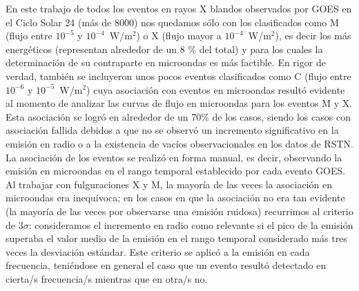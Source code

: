 \documentclass[baaa]{baaa}
\begin{document}
En este trabajo de todos los eventos en rayos X blandos observados por GOES en el Ciclo Solar 24 
(m\'as de 8000) nos quedamos s\'olo con los clasificados como M (flujo entre $10^{-5}$ y $10^{-4}$~W/m$^2$) 
o X (flujo mayor a $10^{-4}$~W/m$^2$), es decir los m\'as energ\'eticos (representan alrededor de un 8 \% del total) 
y para los cuales la determinaci\'on  de su contraparte en microondas es m\'as factible. En rigor de verdad, tambi\'en 
se incluyeron unos pocos eventos clasificados como C (flujo entre $10^{-6}$ y $10^{-5}$~W/m$^2$) cuya asociaci\'on 
con eventos en microondas result\'o evidente al momento de analizar las curvas de flujo en microondas para los eventos 
M y X. Esta asociaci\'on se logr\'o en alrededor de un 70\% de los casos, siendo los casos con asociaci\'on fallida 
debidos a que no se observ\'o un incremento significativo en la emisi\'on en radio o a la existencia de vac\'ios 
observacionales en los datos de RSTN. La asociaci\'on de los eventos se realiz\'o en forma manual, es decir, 
observando la emisi\'on en microondas en el rango temporal establecido por cada evento GOES. Al trabajar con fulguraciones  X y M, la mayor\'ia de las veces la asociaci\'on en microondas era inequ\'ivoca; en los casos en que la asociaci\'on no era tan evidente (la mayor\'ia de las veces por observarse una emisi\'on ruidosa) recurrimos al 
criterio de $3\sigma$: consideramos el 
incremento en radio como relevante si el pico de la emisi\'on superaba el valor medio de la emisi\'on en el rango temporal considerado 
m\'as tres veces la desviaci\'on est\'andar. Este criterio se aplic\'o a la emisi\'on en cada frecuencia, teni\'endose en general el 
caso que un evento result\'o detectado en cierta/s frecuencia/s mientras que en otra/s no. 
\end{document}
